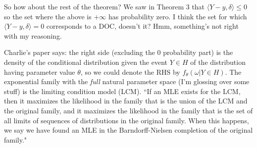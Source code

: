 \documentclass{amsbook}
\newcommand{\inner}[1]{\langle #1 \rangle}
\theoremstyle{definition}
\theoremstyle{remark}
\begin{document}
So how about the rest of the theorem?  We saw in Theorem 3 that $\inner{Y-y,\delta} 
\leq 0$ so the set where the above is $+\infty$ has probability zero.  I think the 
set for which $\inner{Y-y,\delta} = 0$ corresponds to a DOC, doesn't it?  Hmm, 
something's not right with my reasoning.

Charlie's paper says: the right side (excluding the 0 probability part) is the 
density of the conditional distribution given the event $Y \in H$ of the distribution 
having parameter value $\theta$, so we could denote the RHS by $f_\theta(\omega | Y 
\in H)$.  The exponential family with the \emph{full} natural parameter space (I'm 
glossing over some stuff) is the limiting condition model (LCM).  ``If an MLE exists 
for the LCM, then it maximizes the likelihood in the family that is the union of the 
LCM and the original family, and it maximizes the likelihood in the family that is 
the set of all limits of sequences of distributions in the original family.  When 
this happens, we say we have found an MLE in the Barndorff-Nielsen completion of the 
original family."
\end{document}
